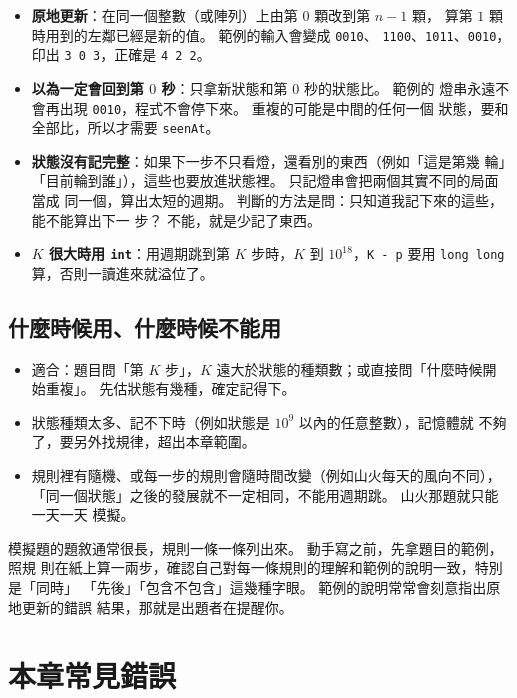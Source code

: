 \begin{itemize}
\item \textbf{原地更新}：在同一個整數（或陣列）上由第 $0$ 顆改到第 $n - 1$ 顆，
算第 $1$ 顆時用到的左鄰已經是新的值。 範例的輸入會變成 \texttt{0010}、
\texttt{1100}、\texttt{1011}、\texttt{0010}，印出 \texttt{3 0 3}，正確是
\texttt{4 2 2}。
\item \textbf{以為一定會回到第 $0$ 秒}：只拿新狀態和第 $0$ 秒的狀態比。 範例的
燈串永遠不會再出現 \texttt{0010}，程式不會停下來。 重複的可能是中間的任何一個
狀態，要和全部比，所以才需要 \texttt{seenAt}。
\item \textbf{狀態沒有記完整}：如果下一步不只看燈，還看別的東西（例如「這是第幾
輪」「目前輪到誰」），這些也要放進狀態裡。 只記燈串會把兩個其實不同的局面當成
同一個，算出太短的週期。 判斷的方法是問：只知道我記下來的這些，能不能算出下一
步？ 不能，就是少記了東西。
\item \textbf{$K$ 很大時用 \texttt{int}}：用週期跳到第 $K$ 步時，$K$ 到
$10^{18}$，\texttt{K - p} 要用 \texttt{long long} 算，否則一讀進來就溢位了。
\end{itemize}

\subsection{什麼時候用、什麼時候不能用}

\begin{itemize}
\item 適合：題目問「第 $K$ 步」，$K$ 遠大於狀態的種類數；或直接問「什麼時候開
始重複」。 先估狀態有幾種，確定記得下。
\item 狀態種類太多、記不下時（例如狀態是 $10^9$ 以內的任意整數），記憶體就
不夠了，要另外找規律，超出本章範圍。
\item 規則裡有隨機、或每一步的規則會隨時間改變（例如山火每天的風向不同），
「同一個狀態」之後的發展就不一定相同，不能用週期跳。 山火那題就只能一天一天
模擬。
\end{itemize}

\begin{apcsnote}
模擬題的題敘通常很長，規則一條一條列出來。 動手寫之前，先拿題目的範例，照規
則在紙上算一兩步，確認自己對每一條規則的理解和範例的說明一致，特別是「同時」
「先後」「包含不包含」這幾種字眼。 範例的說明常常會刻意指出原地更新的錯誤
結果，那就是出題者在提醒你。
\end{apcsnote}

\section{本章常見錯誤}
\label{sec:enum-pitfalls}

